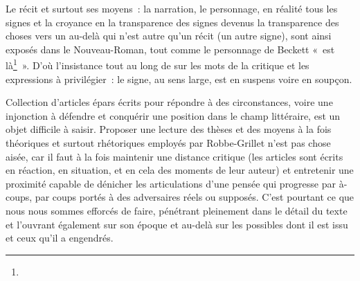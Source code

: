\documentclass[12pt, a4paper]{article}
\begin{document}
Le récit et surtout ses moyens~: la narration, le personnage, en réalité tous les signes et la croyance en la transparence des signes devenus la transparence des choses vers un au-delà qui n'est autre qu'un récit (un autre signe), sont ainsi exposés dans le Nouveau-Roman, tout comme le personnage de Beckett «~est là\footnote{}~». D'où l'insistance tout au long de \punr{} sur les mots de la critique et les expressions à privilégier~: le signe, au sens large, est en suspens voire en soupçon.










\newpage

\vspace*{4cm}

Collection d'articles épars écrits pour répondre à des circonstances, voire une injonction à défendre et conquérir une position dans le champ littéraire, \punr{} est un objet difficile à saisir. Proposer une lecture des thèses et des moyens à la fois théoriques et surtout rhétoriques employés par Robbe-Grillet n'est pas chose aisée, car il faut à la fois maintenir une distance critique (les articles sont écrits en réaction, en situation, et en cela des moments de leur auteur) et entretenir une proximité capable de dénicher les articulations d'une pensée qui progresse par à-coups, par coups portés à des adversaires réels ou supposés. C'est pourtant ce que nous nous sommes efforcés de faire, pénétrant pleinement dans le détail du texte et l'ouvrant également sur son époque et au-delà sur les possibles dont il est issu et ceux qu'il a engendrés.
\end{document}
